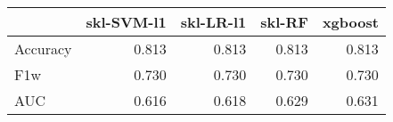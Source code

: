 \begin{tabular}{lrrrr}
\toprule
{} &  skl-SVM-l1 &  skl-LR-l1 &  skl-RF &  xgboost \\
\midrule
Accuracy &       0.813 &      0.813 &   0.813 &    0.813 \\
F1w      &       0.730 &      0.730 &   0.730 &    0.730 \\
AUC      &       0.616 &      0.618 &   0.629 &    0.631 \\
\bottomrule
\end{tabular}
